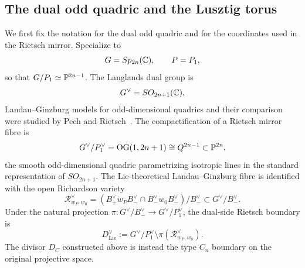 \subsection{The dual odd quadric and the Lusztig torus}
We first fix the notation for the dual odd quadric and for the coordinates used in the Rietsch mirror. Specialize to
\[
G=Sp_{2n}(\mathbb{C}),
\qquad
P=P_1,
\]
so that \(G/P_1\simeq \mathbb{P}^{2n-1}\). The Langlands dual group is
\[
G^\vee=SO_{2n+1}(\mathbb{C}),
\]
Landau--Ginzburg models for odd-dimensional quadrics and their comparison were studied by Pech and Rietsch~\cite{PR}.
The compactification of a Rietsch mirror fibre is
\[
G^\vee/P_1^\vee
=
\operatorname{OG}(1,2n+1)
\cong Q^{2n-1}\subset \mathbb{P}^{2n},
\]
the smooth odd-dimensional quadric parametrizing isotropic lines in the standard representation of \(SO_{2n+1}\).
The Lie-theoretical Landau--Ginzburg fibre is identified with the open Richardson variety
\[
\mathcal R_{w_P,w_0}^\vee
=
(B_+^\vee\dot w_PB_-^\vee \cap B_-^\vee\dot w_0B_-^\vee)/B_-^\vee
\subset G^\vee/B_-^\vee .
\]
Under the natural projection \(\pi\colon G^\vee/B_-^\vee\to G^\vee/P_1^\vee\), the dual-side Rietsch boundary is
\[
D_{\mathrm{Lie}}^\vee
:=
G^\vee/P_1^\vee\setminus \pi(\mathcal R_{w_P,w_0}^\vee).
\]
The divisor \(D_C\) constructed above is instead the type \(C_n\) boundary on the original projective space.

